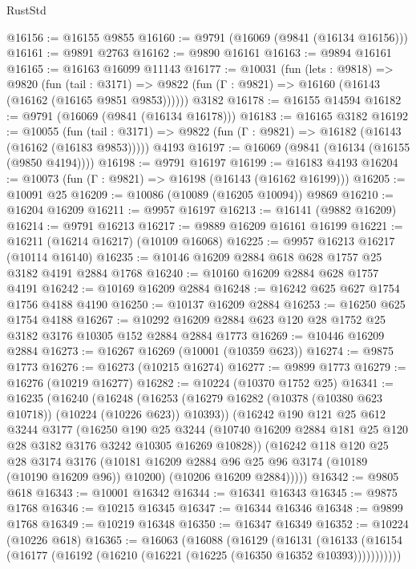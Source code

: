\begin{lexlean}{RustStd}
\begin{coremodule}
@16156 := @16155 @9855
@16160 := @9791 (@16069 (@9841 (@16134 @16156)))
@16161 := @9891 @2763
@16162 := @9890 @16161
@16163 := @9894 @16161
@16165 := @16163 @16099 @11143
@16177 := @10031
    (fun (lets : @9818) =>
    @9820
      (fun (tail : @3171) =>
      @9822 (fun (Γ : @9821) => @16160 (@16143 (@16162 (@16165 @9851 @9853))))))
    @3182
@16178 := @16155 @14594
@16182 := @9791 (@16069 (@9841 (@16134 @16178)))
@16183 := @16165 @3182
@16192 := @10055
    (fun (tail : @3171) => @9822 (fun (Γ : @9821) => @16182 (@16143 (@16162 (@16183 @9853)))))
    @4193
@16197 := @16069 (@9841 (@16134 (@16155 (@9850 @4194))))
@16198 := @9791 @16197
@16199 := @16183 @4193
@16204 := @10073 (fun (Γ : @9821) => @16198 (@16143 (@16162 @16199)))
@16205 := @10091 @25
@16209 := @10086 (@10089 (@16205 @10094)) @9869
@16210 := @16204 @16209
@16211 := @9957 @16197
@16213 := @16141 (@9882 @16209)
@16214 := @9791 @16213
@16217 := @9889 @16209 @16161 @16199
@16221 := @16211 (@16214 @16217) (@10109 @16068)
@16225 := @9957 @16213 @16217 (@10114 @16140)
@16235 := @10146 @16209 @2884 @618 @628 @1757 @25 @3182 @4191 @2884 @1768
@16240 := @10160 @16209 @2884 @628 @1757 @4191
@16242 := @10169 @16209 @2884
@16248 := @16242 @625 @627 @1754 @1756 @4188 @4190
@16250 := @10137 @16209 @2884
@16253 := @16250 @625 @1754 @4188
@16267 := @10292 @16209 @2884 @623 @120 @28 @1752 @25 @3182 @3176 @10305 @152 @2884 @2884 @1773
@16269 := @10446 @16209 @2884
@16273 := @16267 @16269 (@10001 (@10359 @623))
@16274 := @9875 @1773
@16276 := @16273 (@10215 @16274)
@16277 := @9899 @1773
@16279 := @16276 (@10219 @16277)
@16282 := @10224 (@10370 @1752 @25)
@16341 := @16235
    (@16240
      (@16248
        (@16253 (@16279 @16282 (@10378 (@10380 @623 @10718)) (@10224 (@10226 @623)) @10393))
        (@16242
          @190
          @121
          @25
          @612
          @3244
          @3177
          (@16250
            @190
            @25
            @3244
            (@10740 @16209 @2884 @181 @25 @120 @28 @3182 @3176 @3242 @10305 @16269 @10828))
          (@16242
            @118
            @120
            @25
            @28
            @3174
            @3176
            (@10181 @16209 @2884 @96 @25 @96 @3174 (@10189 (@10190 @16209 @96)) @10200)
            (@10206 @16209 @2884)))))
@16342 := @9805 @618
@16343 := @10001 @16342
@16344 := @16341 @16343
@16345 := @9875 @1768
@16346 := @10215 @16345
@16347 := @16344 @16346
@16348 := @9899 @1768
@16349 := @10219 @16348
@16350 := @16347 @16349
@16352 := @10224 (@10226 @618)
@16365 := @16063
    (@16088
      (@16129
        (@16131
          (@16133 (@16154 (@16177 (@16192 (@16210 (@16221 (@16225 (@16350 @16352 @10393)))))))))))

\end{coremodule}
\end{lexlean}
